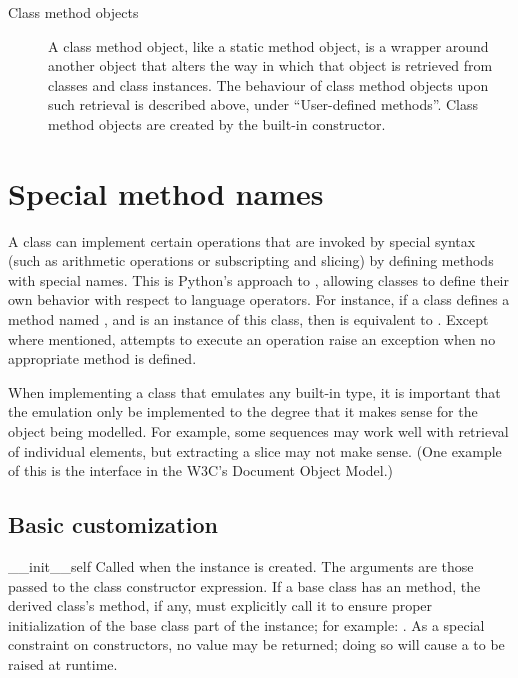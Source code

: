 \begin{description}
\begin{description}
\item[Class method objects]
A class method object, like a static method object, is a wrapper
around another object that alters the way in which that object
is retrieved from classes and class instances. The behaviour of
class method objects upon such retrieval is described above,
under ``User-defined methods''. Class method objects are created
by the built-in  constructor.

\end{description} %

\end{description} %


\section{Special method names\label{specialnames}}

A class can implement certain operations that are invoked by special
syntax (such as arithmetic operations or subscripting and slicing) by
defining methods with special names.
This is Python's approach to , allowing
classes to define their own behavior with respect to language
operators.  For instance, if a class defines
a method named , and  is an instance of
this class, then  is equivalent to
.  Except where mentioned, attempts to execute
an operation raise an exception when no appropriate method is defined.

When implementing a class that emulates any built-in type, it is
important that the emulation only be implemented to the degree that it
makes sense for the object being modelled.  For example, some
sequences may work well with retrieval of individual elements, but
extracting a slice may not make sense.  (One example of this is the
 interface in the W3C's Document Object Model.)


\subsection{Basic customization\label{customization}}

\begin{methoddesc}[object]{__init__}{self\optional{, \moreargs}}
Called when the instance is created.  The
arguments are those passed to the class constructor expression.  If a
base class has an  method, the derived class's
 method, if any, must explicitly call it to ensure proper
initialization of the base class part of the instance; for example:
.  As a special
constraint on constructors, no value may be returned; doing so will
cause a  to be raised at runtime.
\end{methoddesc}


